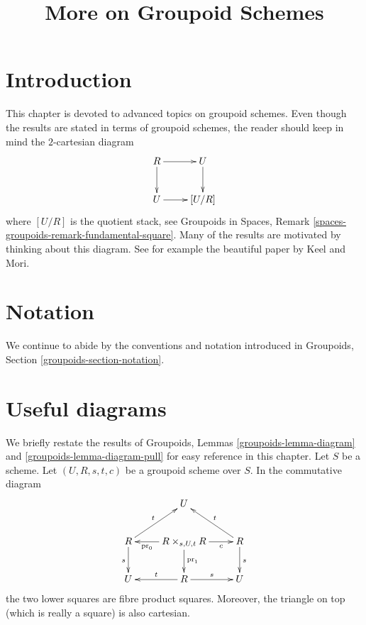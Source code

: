 \documentclass{stacks-project}
\theoremstyle{plain}
\theoremstyle{definition}
\theoremstyle{remark}
\numberwithin{equation}{subsection}
\begin{document}
\title{More on Groupoid Schemes}


\maketitle

\label{section-phantom}

\tableofcontents

\section{Introduction}
\label{section-introduction}

\noindent
This chapter is devoted to advanced topics on groupoid schemes.
Even though the results are stated in terms of groupoid schemes, the
reader should keep in mind the $2$-cartesian diagram
\begin{equation}
\label{equation-quotient-stack}
\vcenter{
\xymatrix{
R \ar[r] \ar[d] & U \ar[d] \\
U \ar[r] & [U/R]
}
}
\end{equation}
where $[U/R]$ is the quotient stack, see
Groupoids in Spaces, Remark \ref{spaces-groupoids-remark-fundamental-square}.
Many of the results are motivated by thinking about this diagram.
See for example the beautiful paper \cite{K-M} by Keel and Mori.





\section{Notation}
\label{section-notation}

\noindent
We continue to abide by the conventions and notation introduced in
Groupoids, Section \ref{groupoids-section-notation}.






\section{Useful diagrams}
\label{section-diagrams}

\noindent
We briefly restate the results of
Groupoids, Lemmas \ref{groupoids-lemma-diagram} and
\ref{groupoids-lemma-diagram-pull}
for easy reference in this chapter.
Let $S$ be a scheme.
Let $(U, R, s, t, c)$ be a groupoid scheme over $S$.
In the commutative diagram
\begin{equation}
\label{equation-diagram}
\vcenter{
\xymatrix{
& U & \\
R \ar[d]_s \ar[ru]^t &
R \times_{s, U, t} R
\ar[l]^-{\text{pr}_0} \ar[d]^{\text{pr}_1} \ar[r]_-c &
R \ar[d]^s \ar[lu]_t \\
U & R \ar[l]_t \ar[r]^s & U
}
}
\end{equation}
the two lower squares are fibre product squares.
Moreover, the triangle on top (which is really a square)
is also cartesian.
\end{document}
